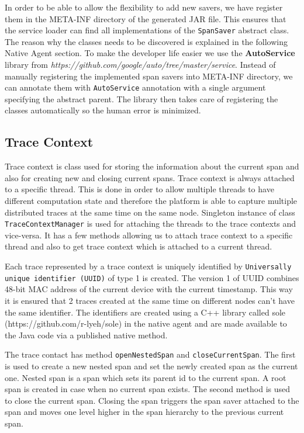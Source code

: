 In order to be able to allow the flexibility to add new savers, we have register them in the META-INF directory of the generated JAR file. This ensures that the service loader can find all implementations of the \texttt{SpanSaver} abstract class. The reason why the classes needs to be discovered is explained in the following Native Agent section. To make the developer life easier we use the \textbf{AutoService}  library from \textit{https://github.com/google/auto/tree/master/service}. Instead of manually registering the implemented span savers into META-INF directory, we can annotate them with \texttt{AutoService} annotation with a single argument specifying the abstract parent. The library then takes care of registering the classes automatically so the human error is minimized.

\subsection{Trace Context}
Trace context is class used for storing the information about the current span and also for creating new and closing current spans. Trace context is always attached to a specific thread. This is done in order to allow multiple threads to have different computation state and therefore the platform is able to capture multiple distributed traces at the same time on the same node. Singleton instance of class \texttt{TraceContextManager} is used for attaching the threads to the trace contexts and vice-versa. It has a few methods allowing us to attach trace context to a specific thread and also to get trace context which is attached to a current thread.

Each trace represented by a trace context is uniquely identified by \texttt{Universally unique identifier (UUID)} of type 1 is created. The version 1 of UUID combines 48-bit MAC address of the current device with the current timestamp. This way it is ensured that 2 traces created at the same time on different nodes can't have the same identifier. The identifiers are created using a C++ library called sole (https://github.com/r-lyeh/sole) in the native agent and are made available to the Java code via a published native method.

The trace contact has method \texttt{openNestedSpan} and \texttt{closeCurrentSpan}. The first is used to create a new nested span and set the newly created span as the current one. Nested span is a span which sets its parent id to the current span. A root span is created in case when no current span exists. The second method is used to close the current span. Closing the span triggers the span saver attached to the span and moves one level higher in the span hierarchy to the previous current span.


